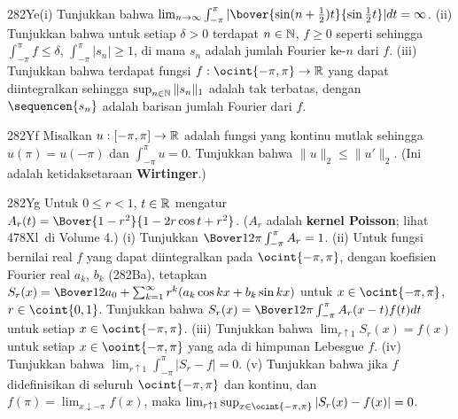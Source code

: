 {\spheader 282Ye(i) Tunjukkan bahwa $\lim_{n\to\infty}\int_{-\pi}^{\pi}
|\bover{\sin(n+{1\over2})t}{\sin{1\over 2}t}|dt=\infty$.  
(ii) Tunjukkan bahwa untuk setiap $\delta>0$ terdapat $n\in\Bbb N$, $f\ge 0$ seperti
sehingga $\int_{-\pi}^{\pi}f\le\delta$, $\int_{-\pi}^{\pi}|s_n|\ge 1$, di mana
$s_n$ adalah jumlah Fourier ke-$n$ dari $f$.      (iii) Tunjukkan bahwa terdapat fungsi
$f:\ocint{-\pi,\pi}\to\Bbb R$ yang dapat diintegralkan sehingga $\sup_{n\in\Bbb N}\|s_n\|_1$ adalah
tak terbatas, dengan $\sequencen{s_n}$ adalah barisan jumlah Fourier dari
$f$.   

\spheader 282Yf Misalkan $u:[-\pi,\pi]\to\Bbb R$ adalah fungsi
yang kontinu mutlak sehingga $u(\pi)=u(-\pi)$ dan $\int_{-\pi}^{\pi}u=0$.   Tunjukkan
bahwa $\|u\|_2\le\|u'\|_2$.   (Ini adalah ketidaksetaraan {\bf Wirtinger}.)

\spheader 282Yg Untuk $0\le r<1$, $t\in\Bbb R$ mengatur
$A_r(t)=\Bover{1-r^2}{1-2r\cos t+r^2}$.
($A_r$ adalah {\bf kernel Poisson}; lihat 478Xl\Latereditions\ di
Volume 4.)
(i) Tunjukkan $\Bover1{2\pi}\int_{-\pi}^{\pi}A_r=1$.
(ii) Untuk fungsi bernilai real $f$ yang
dapat diintegralkan pada $\ocint{-\pi,\pi}$, dengan koefisien Fourier real
$a_k$, $b_k$ (282Ba), tetapkan
$S_r(x)=\Bover12a_0+\sum_{k=1}^{\infty}r^k(a_k\cos kx+b_k\sin kx)$ untuk
$x\in\ocint{-\pi,\pi}$, $r\in\coint{0,1}$.   Tunjukkan bahwa
$S_r(x)=\Bover1{2\pi}\int_{-\pi}^{\pi}A_r(x-t)f(t)dt$ untuk setiap
$x\in\ocint{-\pi,\pi}$.   
(iii) Tunjukkan bahwa $\lim_{r\uparrow 1}S_r(x)=f(x)$ untuk setiap
$x\in\ooint{-\pi,\pi}$ yang ada di himpunan Lebesgue $f$.
  (iv) Tunjukkan bahwa
$\lim_{r\uparrow 1}\int_{-\pi}^{\pi}|S_r-f|=0$.   (v) Tunjukkan bahwa jika $f$
didefinisikan di seluruh $\ocint{-\pi,\pi}$ dan kontinu, dan
$f(\pi)=\lim_{x\downarrow-\pi}f(x)$, maka
$\lim_{r\uparrow 1}\sup_{x\in\ocint{-\pi,\pi}}|S_r(x)-f(x)|=0$.
}%

